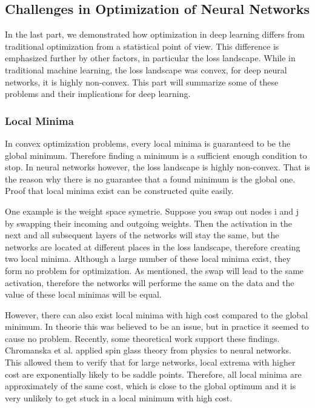 \subsection{Challenges in Optimization of Neural Networks}
In the last part, we demonstrated how optimization in deep learning differs from
traditional optimization from a statistical point of view. This difference is
emphasized further by other factors, in particular the loss landscape. While in
traditional machine learning, the loss landscape was convex, for deep neural
networks, it is highly non-convex. This part will summarize some of these
problems and their implications for deep learning.


\subsubsection{Local Minima}\label{sub:Local_minima}
In convex optimization problems, every local minima is guaranteed to be the
global minimum. Therefore finding a minimum is a sufficient enough condition to
stop. In neural networks however, the loss landscape is highly non-convex. That
is the reason why there is no guarantee that a found minimum is the global one.
Proof that local minima exist can be constructed quite easily.

One example is the weight space symetrie. Suppose you swap out nodes i and j by
swapping their incoming and outgoing weights. Then the activation in the next
and all subsequent layers of the networks will stay the same, but the networks
are located at different places in the loss landscape, therefore creating two
local minima. Although a large number of these local minima exist, they form no
problem for optimization. As mentioned, the swap will lead to the same
activation, therefore the networks will performe the same on the data and the
value of these local minimas will be equal.

However, there can also exist local minima with high cost compared to the global
minimum. In theorie this was believed to be an issue, but in practice it seemed
to cause no problem. Recently, some theoretical work support these findings.
Chromanska et al. \cite{choromanska2015loss} applied spin glass theory from
physics to neural networks. This allowed them to verify that for large networks,
local extrema with higher cost are exponentially likely to be saddle points.
Therefore, all local minima are approximately of the same cost, which is close
to the global optimum and it is very unlikely to get stuck in a local minimum
with high cost.

